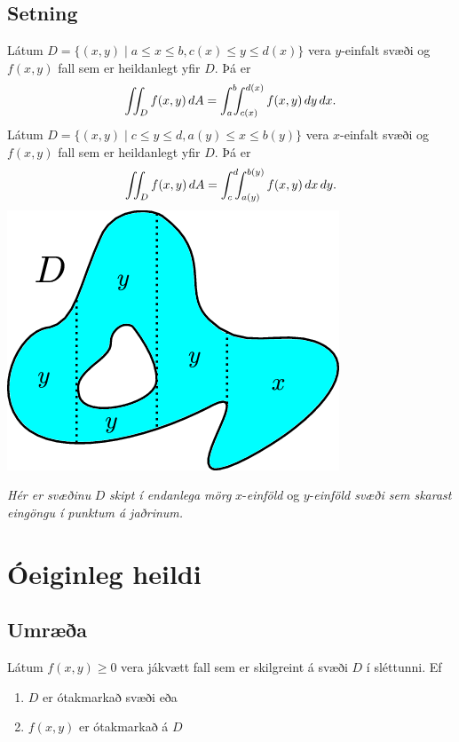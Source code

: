 \documentclass[a4paper,10pt,icelandic]{sphinxmanual}
\begin{document}
\subsection{Setning}
\label{Kafli4:id7}
Látum \(D=\{(x,y)\mid a\leq x\leq b, c(x)\leq y\leq d(x)\}\) vera
\(y\)-einfalt svæði og \(f(x,y)\) fall sem er heildanlegt yfir
\(D\). Þá er
\begin{gather}
\begin{split}\displaystyle \int\!\!\!\int_D f(x,y)\,dA=\int_a^b\!\!\!\int_{c(x)}^{d(x)}f(x,y)\,dy\, dx.\end{split}\notag
\end{gather}
Látum \(D=\{(x,y)\mid c\leq y\leq d, a(y)\leq x\leq b(y)\}\) vera
\(x\)-einfalt svæði og \(f(x,y)\) fall sem er heildanlegt yfir
\(D\). Þá er
\begin{gather}
\begin{split}\displaystyle \int\!\!\!\int_D f(x,y)\,dA=\int_c^d\!\!\!\int_{a(y)}^{b(y)}f(x,y)\,dx\, dy.\end{split}\notag
\end{gather}
{\hfill\includegraphics[width=0.350\linewidth]{einfalt2.png}\hfill}

\emph{Hér er svæðinu} \(D\) \emph{skipt í endanlega mörg} \(x\)-\emph{einföld} og \(y\)-\emph{einföld svæði sem skarast eingöngu í punktum á jaðrinum.}


\section{Óeiginleg heildi}
\label{Kafli4:oeiginleg-heildi}

\subsection{Umræða}
\label{Kafli4:umraea}
Látum \(f(x,y)\geq 0\) vera jákvætt fall sem er skilgreint á svæði
\(D\) í sléttunni. Ef
\begin{enumerate}
\item {} 
\(D\) er ótakmarkað svæði eða

\item {} 
\(f(x,y)\) er ótakmarkað á \(D\)

\end{enumerate}
\end{document}
